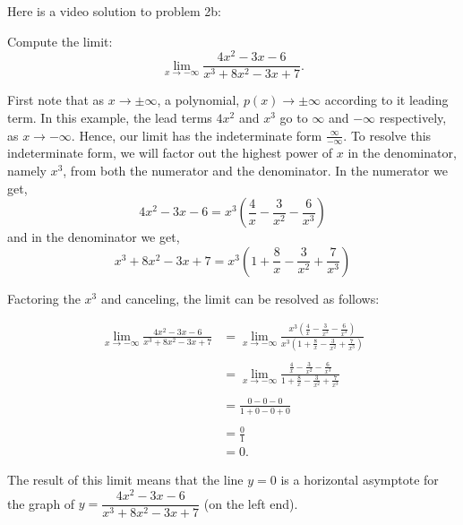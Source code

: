 \documentclass[handout]{ximera}
\begin{document}
Here is a video solution to problem 2b:
\begin{foldable}
\end{foldable}



\begin{example}[example 3]
Compute the limit:
\[
\lim_{x \to -\infty} \frac{4x^2 - 3x - 6}{x^3 +8x^2 -3x + 7}.
\]


First note that as $x\to \pm \infty$, a polynomial, $p(x) \to \pm \infty$ according to it leading term.
In this example, the lead terms $4x^2$ and $x^3$  go to $\infty$ and $-\infty$ respectively, as $x \to -\infty$. 
Hence, our limit has the indeterminate form
$\frac{\infty}{-\infty}$.
To resolve this indeterminate form, we will factor out 
the highest power of $x$ in the denominator, namely $x^3$, from both the numerator and the denominator.  
In the numerator we get, 
\[4x^2 - 3x - 6 = x^3\left(\frac{4}{x} - \frac{3}{x^2} - \frac{6}{x^3}\right)\]
and in the denominator we get,
\[x^3 +8x^2 -3x + 7 = x^3\left(1 +  \frac{8}{x} - \frac{3}{x^2} + \frac{7}{x^3}\right)\]

Factoring the $x^3$ and canceling, the limit can be resolved as follows:

\begin{align*}
\lim_{x \to -\infty}\frac{4x^2 - 3x - 6}{x^3 +8x^2 -3x + 7} &= 
\lim_{x \to -\infty} \frac{x^3\left(\frac{4}{x}-\frac{3}{x^2} -\frac{6}{x^3}\right)}
{x^3\left(1 + \frac{8}{x}-\frac{3}{x^2}+\frac{7}{x^3}\right)} \\ \\
&=\lim_{x \to -\infty} \frac{\frac{4}{x}-\frac{3}{x^2} -\frac{6}{x^3}}{1 + \frac{8}{x}-\frac{3}{x^2}+\frac{7}{x^3}} \\ \\
&=\frac{0 - 0 - 0}{1 +0- 0 + 0} \\ \\
&= \frac01 \\
&= 0.
\end{align*}

The result of this limit means that the line $y = 0$  is a horizontal asymptote
for the graph of $y = \dfrac{4x^2 - 3x - 6}{x^3 +8x^2 -3x + 7}$ (on the left end).
\end{example}
\end{document}

